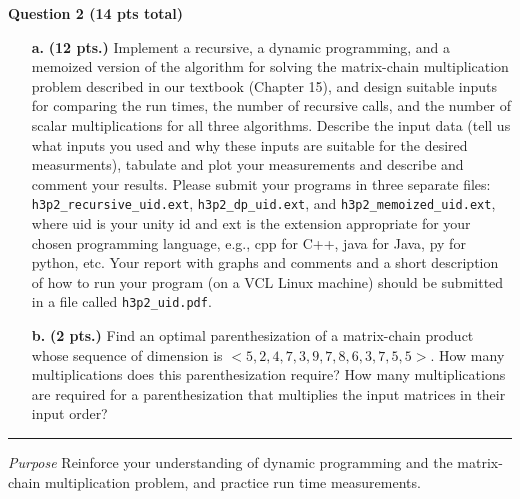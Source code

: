 \documentclass{article}
\newcommand\separator{\rule{\textwidth}{.2pt}}
\begin{document}
\begin{framed}
    \textbf{Question 2 (14 pts total)}
    
    \begin{enumerate}
	\item[\textbf{a.}] \textbf{(12 pts.)} Implement a recursive, a dynamic 
	programming, and a memoized version of the algorithm for solving the 
	matrix-chain multiplication problem described in our textbook (Chapter 
	15), and design suitable inputs for comparing the run times, the number 
	of recursive calls, and the number of scalar multiplications for all 
	three algorithms. Describe the input data (tell us what inputs you used 
	and why these inputs are suitable for the desired measurments), tabulate 
	and plot your measurements and describe and comment your results. 
	Please submit your programs in three separate files: 
	\texttt{h3p2\_recursive\_uid.ext}, \texttt{h3p2\_dp\_uid.ext}, and 
	\texttt{h3p2\_memoized\_uid.ext}, where uid is your unity id and ext is
	the extension appropriate for your chosen programming language, e.g., 
	cpp for C++, java for Java, py for python, etc. Your report with graphs 
	and comments and a short description of how to run your program (on a 
	VCL Linux machine) should be submitted in a file called 
	\texttt{h3p2\_uid.pdf}.
        \item[\textbf{b.}] \textbf{(2 pts.)} Find an optimal parenthesization 
	of a matrix-chain product whose sequence of dimension is $<5, 2, 4, 7, 
	3, 9, 7, 8, 6, 3, 7, 5, 5>$. How many multiplications does this 
	parenthesization require? How many multiplications are required for a 
	parenthesization that multiplies the input matrices in their input 
	order?
    \end{enumerate}


    \separator

    \textit{Purpose} Reinforce your understanding of dynamic programming and 
    the matrix-chain multiplication problem, and practice run time measurements. 

\end{framed}



\newpage




\end{document}
